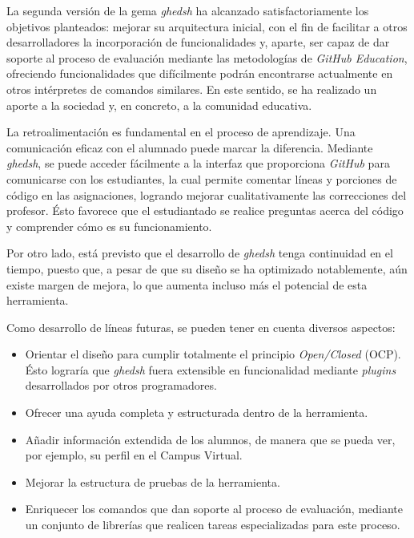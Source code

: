 

La segunda versión de la gema {\it ghedsh} ha alcanzado satisfactoriamente los objetivos planteados: mejorar su arquitectura inicial, con el fin de facilitar a otros desarrolladores
la incorporación de funcionalidades y, aparte, ser capaz de dar soporte al proceso de evaluación mediante las metodologías de {\it GitHub Education}, ofreciendo funcionalidades que difícilmente
podrán encontrarse actualmente en otros intérpretes de comandos similares. En este sentido, se ha realizado un aporte a la sociedad y, en concreto, a la comunidad educativa.
\bigskip

La retroalimentación es fundamental en el proceso de aprendizaje. Una comunicación eficaz con el alumnado puede marcar la diferencia. Mediante {\it ghedsh}, se puede acceder fácilmente a la interfaz que proporciona {\it GitHub} para comunicarse con los estudiantes, la cual permite comentar líneas y porciones de código en las asignaciones, logrando
mejorar cualitativamente las correcciones del profesor. Ésto favorece que el estudiantado se realice preguntas acerca del código y comprender cómo es su funcionamiento.
\bigskip

Por otro lado, está previsto que el desarrollo de {\it ghedsh} tenga continuidad en el tiempo, puesto que, a pesar de que su diseño se ha optimizado notablemente, aún existe margen de mejora, lo que aumenta incluso más el potencial de esta herramienta.
\bigskip

Como desarrollo de líneas futuras, se pueden tener en cuenta diversos aspectos:
\begin{itemize}
	\item Orientar el diseño para cumplir totalmente el principio {\it Open/Closed} (OCP). Ésto lograría que {\it ghedsh} fuera extensible en funcionalidad mediante {\it plugins} desarrollados por otros programadores.
	\item Ofrecer una ayuda completa y estructurada dentro de la herramienta.
	\item Añadir información extendida de los alumnos, de manera que se pueda ver, por ejemplo, su perfil en el Campus Virtual.
	\item Mejorar la estructura de pruebas de la herramienta.
	\item Enriquecer los comandos que dan soporte al proceso de evaluación, mediante un conjunto de librerías que realicen tareas especializadas para este proceso.
\end{itemize}